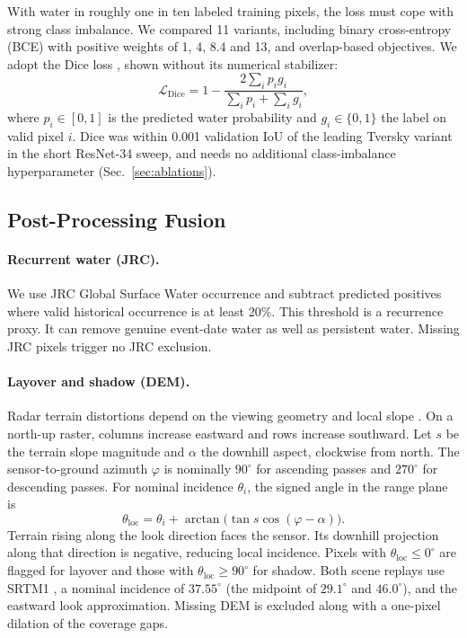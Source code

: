 With water in roughly one in ten labeled training pixels, the loss must
cope with strong class imbalance. We compared 11 variants, including
binary cross-entropy (BCE) with positive weights of 1, 4, 8.4 and 13,
and overlap-based objectives. We adopt the Dice loss \cite{milletari2016},
shown without its numerical stabilizer:
\begin{equation}
\mathcal{L}_{\mathrm{Dice}}
=1-\frac{2\sum_i p_i g_i}{\sum_i p_i+\sum_i g_i},
\label{eq:dice}
\end{equation}
where $p_i\in[0,1]$ is the predicted water probability and
$g_i\in\{0,1\}$ the label on valid pixel $i$. Dice was within 0.001
validation IoU of the leading Tversky variant in the short ResNet-34
sweep, and needs no additional class-imbalance hyperparameter
(Sec.~\ref{sec:ablations}).

\subsection{Post-Processing Fusion}
\label{sec:fusion}

\paragraph{Recurrent water (JRC).}
We use JRC Global Surface Water occurrence \cite{pekel2016high} and
subtract predicted positives where valid historical occurrence is at
least 20\%. This threshold is a recurrence proxy. It can remove genuine
event-date water as well as persistent water. Missing JRC pixels trigger
no JRC exclusion.

\paragraph{Layover and shadow (DEM).}
Radar terrain distortions depend on the viewing geometry and local
slope \cite{vollrath2020}. On a north-up raster, columns increase
eastward and rows increase southward. Let $s$ be the terrain slope
magnitude and $\alpha$ the downhill aspect, clockwise from north.
The sensor-to-ground azimuth $\varphi$ is nominally $90^\circ$ for
ascending passes and $270^\circ$ for descending passes. For nominal
incidence $\theta_i$, the signed angle in the range plane is
\begin{equation}
\theta_{\mathrm{loc}}=\theta_i+
\arctan\!\bigl(\tan s\cos(\varphi-\alpha)\bigr).
\label{eq:local-incidence}
\end{equation}
Terrain rising along the look direction faces the sensor. Its
downhill projection along that direction is negative, reducing
local incidence. Pixels with $\theta_{\mathrm{loc}}\leq0^\circ$ are
flagged for layover and those with $\theta_{\mathrm{loc}}\geq90^\circ$
for shadow. Both scene replays use SRTM1 \cite{farr2007}, a nominal
incidence of $37.55^\circ$ (the midpoint of $29.1^\circ$ and $46.0^\circ$),
and the eastward look approximation. Missing DEM is excluded along
with a one-pixel dilation of the coverage gaps.

